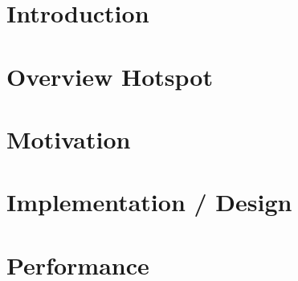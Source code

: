 \documentclass[11pt,a4paper]{book}
\begin{document}
\nocite{*}

\frontmatter


\chapter*{Introduction}
\label{c:Introduction}



\tableofcontents

\mainmatter
\chapter{Overview Hotspot}
\label{c:overview}


\chapter{Motivation}
\label{c:motivation}


\chapter{Implementation / Design}
\label{c:implementation}


\chapter{Performance}
\label{c:performance}

\end{document}
